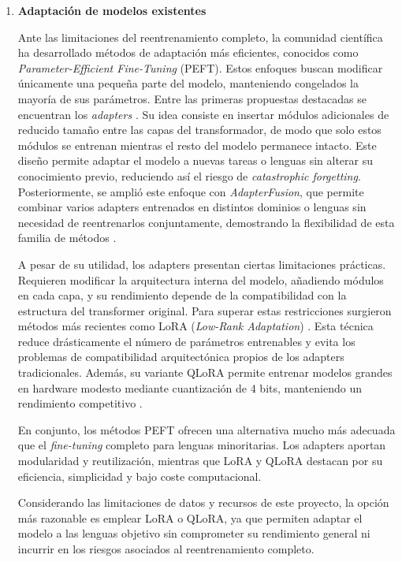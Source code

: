 \begin{enumerate}
\item \textbf{Adaptación de modelos existentes}

Ante las limitaciones del reentrenamiento completo, la comunidad científica ha desarrollado métodos de adaptación más eficientes, conocidos como \textit{Parameter-Efficient Fine-Tuning} (PEFT). Estos enfoques buscan modificar únicamente una pequeña parte del modelo, manteniendo congelados la mayoría de sus parámetros. Entre las primeras propuestas destacadas se encuentran los \textit{adapters} \cite{houlsby2019parameterefficienttransferlearningnlp}. Su idea consiste en insertar módulos adicionales de reducido tamaño entre las capas del transformador, de modo que solo estos módulos se entrenan mientras el resto del modelo permanece intacto. Este diseño permite adaptar el modelo a nuevas tareas o lenguas sin alterar su conocimiento previo, reduciendo así el riesgo de \textit{catastrophic forgetting}. Posteriormente, se amplió este enfoque con \textit{AdapterFusion}, que permite combinar varios adapters entrenados en distintos dominios o lenguas sin necesidad de reentrenarlos conjuntamente, demostrando la flexibilidad de esta familia de métodos \cite{pfeiffer2021adapterfusionnondestructivetaskcomposition}.

A pesar de su utilidad, los adapters presentan ciertas limitaciones prácticas. Requieren modificar la arquitectura interna del modelo, añadiendo módulos en cada capa, y su rendimiento depende de la compatibilidad con la estructura del transformer original. Para superar estas restricciones surgieron métodos más recientes como LoRA (\textit{Low-Rank Adaptation}) \cite{hu2021loralowrankadaptationlarge}. Esta técnica reduce drásticamente el número de parámetros entrenables y evita los problemas de compatibilidad arquitectónica propios de los adapters tradicionales. Además, su variante QLoRA permite entrenar modelos grandes en hardware modesto mediante cuantización de 4 bits, manteniendo un rendimiento competitivo \cite{dettmers2023qlora}.

En conjunto, los métodos PEFT ofrecen una alternativa mucho más adecuada que el \textit{fine-tuning} completo para lenguas minoritarias. Los adapters aportan modularidad y reutilización, mientras que LoRA y QLoRA destacan por su eficiencia, simplicidad y bajo coste computacional. 

Considerando las limitaciones de datos y recursos de este proyecto, la opción más razonable es emplear LoRA o QLoRA, ya que permiten adaptar el modelo a las lenguas objetivo sin comprometer su rendimiento general ni incurrir en los riesgos asociados al reentrenamiento completo.


\end{enumerate}


